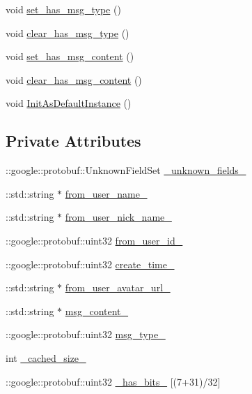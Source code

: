 \begin{DoxyCompactItemize}
\item 
void \hyperlink{class_i_m_1_1_base_define_1_1_server_msg_info_a67f32a781005deb1ba504d36161a5172}{set\+\_\+has\+\_\+msg\+\_\+type} ()
\item 
void \hyperlink{class_i_m_1_1_base_define_1_1_server_msg_info_a9017b4a9b9a4a19240930a1492471500}{clear\+\_\+has\+\_\+msg\+\_\+type} ()
\item 
void \hyperlink{class_i_m_1_1_base_define_1_1_server_msg_info_a7d28a44dc89e8198f3b06bb13dba4dd7}{set\+\_\+has\+\_\+msg\+\_\+content} ()
\item 
void \hyperlink{class_i_m_1_1_base_define_1_1_server_msg_info_aab186a9d32ba4a1ffd01273a912b6b0f}{clear\+\_\+has\+\_\+msg\+\_\+content} ()
\item 
void \hyperlink{class_i_m_1_1_base_define_1_1_server_msg_info_acdd49a965b4605b467f6661f9a189180}{Init\+As\+Default\+Instance} ()
\end{DoxyCompactItemize}
\subsection*{Private Attributes}
\begin{DoxyCompactItemize}
\item 
\+::google\+::protobuf\+::\+Unknown\+Field\+Set \hyperlink{class_i_m_1_1_base_define_1_1_server_msg_info_a2b555f47fa2e44e83bedeb9e59ef96aa}{\+\_\+unknown\+\_\+fields\+\_\+}
\item 
\+::std\+::string $\ast$ \hyperlink{class_i_m_1_1_base_define_1_1_server_msg_info_a7fd8682a9e8b9dc89e33c3675cdd30ab}{from\+\_\+user\+\_\+name\+\_\+}
\item 
\+::std\+::string $\ast$ \hyperlink{class_i_m_1_1_base_define_1_1_server_msg_info_a1e2ba40398521783c57f5ead518d277e}{from\+\_\+user\+\_\+nick\+\_\+name\+\_\+}
\item 
\+::google\+::protobuf\+::uint32 \hyperlink{class_i_m_1_1_base_define_1_1_server_msg_info_a9c8e64eae8bbd967689235426d67678d}{from\+\_\+user\+\_\+id\+\_\+}
\item 
\+::google\+::protobuf\+::uint32 \hyperlink{class_i_m_1_1_base_define_1_1_server_msg_info_a8e3237d6a3ee342d1a00a21d072a0ed7}{create\+\_\+time\+\_\+}
\item 
\+::std\+::string $\ast$ \hyperlink{class_i_m_1_1_base_define_1_1_server_msg_info_ab05b6ffc3074605b8af4f7e46fde5b76}{from\+\_\+user\+\_\+avatar\+\_\+url\+\_\+}
\item 
\+::std\+::string $\ast$ \hyperlink{class_i_m_1_1_base_define_1_1_server_msg_info_ab5bf809a1eae14e238d3d716fb506415}{msg\+\_\+content\+\_\+}
\item 
\+::google\+::protobuf\+::uint32 \hyperlink{class_i_m_1_1_base_define_1_1_server_msg_info_ab1f01d60d5666231a7ed9dce9d8343cd}{msg\+\_\+type\+\_\+}
\item 
int \hyperlink{class_i_m_1_1_base_define_1_1_server_msg_info_a6679dbb3c9df464a6b8a041669764b21}{\+\_\+cached\+\_\+size\+\_\+}
\item 
\+::google\+::protobuf\+::uint32 \hyperlink{class_i_m_1_1_base_define_1_1_server_msg_info_a2cf6cc269a885c2d1a6f2da514257233}{\+\_\+has\+\_\+bits\+\_\+} \mbox{[}(7+31)/32\mbox{]}
\end{DoxyCompactItemize}

